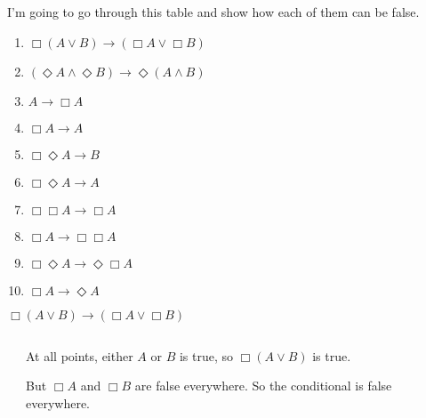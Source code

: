 \documentclass[
  14pt,
  letterpaper,
  ignorenonframetext,
  aspectratio=169,
]{beamer}
\providecommand{\tightlist}{%
  \setlength{\itemsep}{0pt}\setlength{\parskip}{0pt}}\usepackage{longtable,booktabs,array}
\begin{document}
\begin{frame}
I'm going to go through this table and show how each of them can be
false.

\begin{enumerate}[<+->]
\tightlist
\item
  \(\Box(A \vee B) \rightarrow (\Box A \vee \Box B)\)
\item
  \((\Diamond A \wedge \Diamond B) \rightarrow \Diamond (A \wedge B)\)
\item
  \(A \rightarrow \Box A\)
\item
  \(\Box A \rightarrow A\)
\item
  \(\Box \Diamond A \rightarrow B\)
\item
  \(\Box \Diamond A \rightarrow A\)
\item
  \(\Box \Box A \rightarrow \Box A\)
\item
  \(\Box A \rightarrow \Box \Box A\)
\item
  \(\Box \Diamond A \rightarrow \Diamond \Box A\)
\item
  \(\Box A \rightarrow \Diamond A\)
\end{enumerate}
\end{frame}

\begin{frame}{\(\Box(A \vee B) \rightarrow (\Box A \vee \Box B)\)}
\protect\hypertarget{boxa-vee-b-rightarrow-box-a-vee-box-b}{}
\begin{columns}
    \begin{column}{0.65\textwidth}
    \end{column}
    \begin{column}{0.3\textwidth}
At all points, either $A$ or $B$ is true, so $\Box(A \vee B)$ is true.  

\bigskip

But $\Box A$ and $\Box B$ are false everywhere.  So the conditional is false everywhere.
\end{column}
\end{columns}
\end{frame}
\end{document}
